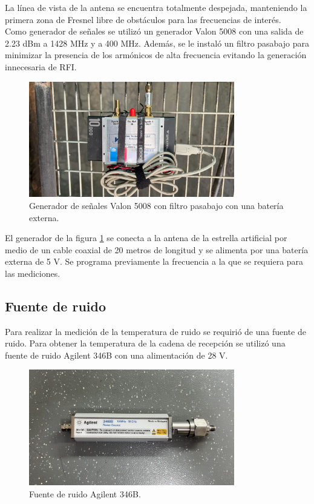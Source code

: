 La línea de vista de la antena se encuentra totalmente despejada, manteniendo la primera zona de Fresnel libre de obstáculos para las frecuencias de interés.\\

Como generador de señales se utilizó un generador Valon 5008 con una salida de 2.23 dBm a 1428 MHz y a 400 MHz. Además, se le instaló un filtro pasabajo para minimizar la presencia de los armónicos de alta frecuencia evitando la generación innecesaria de RFI.\\

\begin{figure}
    \centering
    \includegraphics[width=0.8\textwidth]{img/valon}
    \caption{Generador de señales Valon 5008 con filtro pasabajo con una batería externa.}
    \label{fig:generador}
\end{figure}

El generador de la figura \ref{fig:generador} se conecta a la antena de la estrella artificial por medio de un cable coaxial de 20 metros de longitud y se alimenta por una batería externa de 5 V. Se programa previamente la frecuencia a la que se requiera para las mediciones.\\

\subsection{Fuente de ruido}

Para realizar la medición de la temperatura de ruido se requirió de una fuente de ruido. Para obtener la temperatura de la cadena de recepción se utilizó una fuente de ruido Agilent 346B con una alimentación de 28 V.\\

\begin{figure}
    \centering
    \includegraphics[width=0.8\textwidth]{img/fuenteRuido}
    \caption{Fuente de ruido Agilent 346B.}
    \label{fig:fuente_ruido}
\end{figure}

